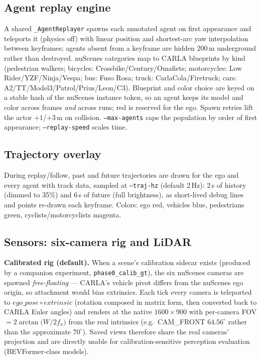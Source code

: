 \documentclass[11pt]{article}
\newcommand{\code}[1]{{\setlength{\fboxsep}{1.5pt}\colorbox{codegray}{\small\texttt{#1}}}}
\newcommand{\file}[1]{\texttt{#1}}
\begin{document}
\subsection{Agent replay engine}
A shared \code{\_AgentReplayer} spawns each annotated agent on first appearance and
teleports it (physics off) with linear position and shortest-arc yaw interpolation
between keyframes; agents absent from a keyframe are hidden 200\,m underground rather
than destroyed. nuScenes categories map to CARLA blueprints by kind (pedestrian walkers;
bicycles: Crossbike/Century/Omafiets; motorcycles: Low Rider/YZF/Ninja/Vespa; bus:
Fuso Rosa; truck: CarlaCola/Firetruck; cars: A2/TT/Model3/Patrol/Prius/Leon/C3).
Blueprint and color choice are keyed on a stable hash of the nuScenes instance token, so
an agent keeps its model and color across frames \emph{and} across runs; red is
reserved for the ego. Spawn retries lift the actor $+1$/$+3$\,m on collision.
\code{--max-agents} caps the population by order of first appearance;
\code{--replay-speed} scales time.

\subsection{Trajectory overlay}
During replay/follow, past and future trajectories are drawn for the ego and every
agent with track data, sampled at \code{--traj-hz} (default 2\,Hz): 2\,s of history
(dimmed to 35\%) and 6\,s of future (full brightness), as short-lived debug lines and
points re-drawn each keyframe. Colors: ego red, vehicles blue, pedestrians green,
cyclists/motorcyclists magenta.

\subsection{Sensors: six-camera rig and LiDAR}
\textbf{Calibrated rig (default).} When a scene's calibration sidecar exists (produced
by a companion experiment, \file{phase0\_calib\_gt}), the six nuScenes cameras are
spawned \emph{free-floating} --- CARLA's vehicle pivot differs from the nuScenes ego
origin, so attachment would bias extrinsics. Each tick every camera is teleported to
$\mathit{ego\_pose}\circ\mathit{extrinsic}$ (rotation composed in matrix form, then
converted back to CARLA Euler angles) and renders at the native $1600\times900$ with
per-camera FOV $=2\arctan\!\big(W/2f_x\big)$ from the real intrinsics (e.g.\
CAM\_FRONT $64.56^\circ$ rather than the approximate $70^\circ$). Saved views therefore
share the real cameras' projection and are directly usable for calibration-sensitive
perception evaluation (BEVFormer-class models).
\end{document}
